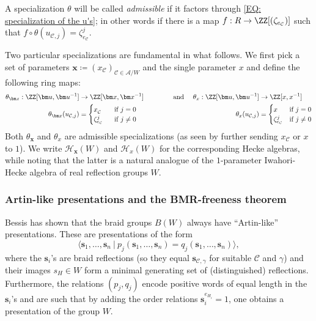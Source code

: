 \begin{defi}\label{Defn: admissible specializations} A specialization $\theta$ will be called \emph{\color{blue} admissible} if it factors through \eqref{EQ: specialization of the u's}; in other words if there is a map $f:R\rightarrow \ZZ[(\zeta_{e_{\mathcal{C}}})]$ such that $f\circ\theta(u_{\mathcal{C},j})=\zeta_{e_{\mathcal{C}}}^j$. 
\end{defi}

Two particular specializations are fundamental in what follows. We first pick a set of parameters $\bm x\coloneqq (x_{\mathcal{C}})_{\mathcal{C}\in\mathcal{A}/W}$ and the single parameter $x$ and define the following ring maps:\begin{align}
\theta_{\bm x}:\ZZ[\bm u,\bm u^{-1}]&\rightarrow \ZZ[\bm x,\bm x^{-1}] \quad\quad \quad\quad\text{ and }& \theta_x:\ZZ[\bm u,\bm u^{-1}]&\rightarrow \ZZ[x,x^{-1}]\nonumber\\
\theta_{\bm x}(u_{\mathcal{C},j})&=\begin{cases} x^{\phantom{N_W}}_{\mathcal{C}}&\text{if }j=0\\ \zeta_{e_{\mathcal{C}}}^j&\text{if }j\neq 0\end{cases}  &\theta_x(u_{\mathcal{C},j})&=\begin{cases} x&\text{if }j=0\\ \zeta_{e_{\mathcal{C}}}^j&\text{if }j\neq 0\end{cases} \label{EQ: admissible specializations}
\end{align}
Both $\theta_{\bm x}$ and $\theta_x$ are admissible specializations (as seen by further sending $x_{\mathcal{C}}$ or $x$ to $1$). We write $\mathcal{H}_{\bm x}(W)$ and $\mathcal{H}_x(W)$ for the corresponding Hecke algebras, while noting that the latter is a natural analogue of the $1$-parameter Iwahori-Hecke algebra of real reflection groups $W$.

\subsubsection*{Artin-like presentations and the BMR-freeness theorem}

Bessis \cite{bes-zariski} has shown that the braid groups $B(W)$ always have ``Artin-like'' presentations. These are presentations of the form $$\langle \bm s_1,\ldots, \bm s_n\ |\ p_j(\bm s_1,\ldots, \bm s_n)= q_j(\bm s_1,\ldots, \bm s_n)\rangle,$$ where the $\bm s_i$'s are braid reflections (so they equal $\bm s_{\mathcal{C},\gamma}$ for suitable $\mathcal{C}$ and $\gamma$) and their images $s_H \in W$ form a minimal generating set of (distinguished) reflections. Furthermore, the relations $(p_j,q_j)$ encode positive words of equal length in the $\bm s_i$'s and are such that by adding the order relations $\bm s_i^{e_{H_i}}=1$, one obtains a presentation of the group $W$.

